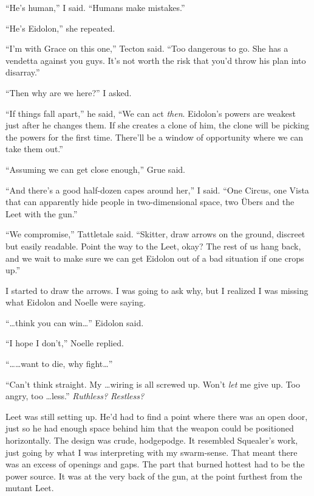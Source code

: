 ``He's human,'' I said.  ``Humans make mistakes.''



``He's Eidolon,'' she repeated.



``I'm with Grace on this one,'' Tecton said.  ``Too dangerous to go.  She has a vendetta against you guys.  It's not worth the risk that you'd throw his plan into disarray.''



``Then why are we here?'' I asked.



``If things fall apart,'' he said, ``We can act \emph{then}.  Eidolon's powers are weakest just after he changes them.  If she creates a clone of him, the clone will be picking the powers for the first time.  There'll be a window of opportunity where we can take them out.''



``Assuming we can get close enough,'' Grue said.



``And there's a good half-dozen capes around her,'' I said.  ``One Circus, one Vista that can apparently hide people in two-dimensional space, two \"{U}bers and the Leet with the gun.''



``We compromise,'' Tattletale said.  ``Skitter, draw arrows on the ground, discreet but easily readable.  Point the way to the Leet, okay?  The rest of us hang back, and we wait to make sure we can get Eidolon out of a bad situation if one crops up.''



I started to draw the arrows.  I was going to ask why, but I realized I was missing what Eidolon and Noelle were saying.



``\ldots{}think you can win\ldots'' Eidolon said.



``I hope I don't,'' Noelle replied.



``\ldots \ldots want to die, why fight\ldots''



``Can't think straight.  My \ldots wiring is all screwed up.  Won't \emph{let} me give up.  Too angry, too \ldots{}less.''  \emph{Ruthless? Restless?}



Leet was still setting up.  He'd had to find a point where there was an open door, just so he had enough space behind him that the weapon could be positioned horizontally.  The design was crude, hodgepodge.  It resembled Squealer's work, just going by what I was interpreting with my swarm-sense.  That meant there was an excess of openings and gaps.  The part that burned hottest had to be the power source.  It was at the very back of the gun, at the point furthest from the mutant Leet.



